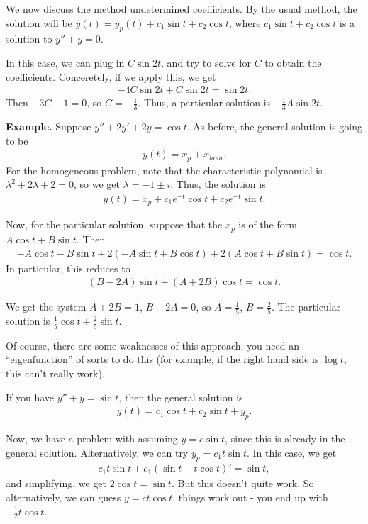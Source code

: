 \documentclass{article}
\begin{document}
We now discuss the method undetermined coefficients.  By the usual method, the solution will be $y(t) = y_p(t) + c_1 \sin t + c_2 \cos t$, where $c_1 \sin t + c_2 \cos t$ is a solution to $y'' + y = 0$.

In this case, we can plug in $C \sin 2t$, and try to solve for $C$ to obtain the coefficients.  Conceretely, if we apply this, we get
\begin{align*}
  - 4 C \sin 2t + C \sin 2t = \sin 2t.
\end{align*}
Then $-3C - 1 = 0$, so $C = -\frac{1}{3}$.  Thus, a particular solution is $- \frac{1}{3} A \sin 2t$.


{\bf Example.} Suppose $y'' + 2y' + 2y = \cos t$.  As before, the general solution is going to be
\begin{align*}
  y(t) = x_p + x_{hom}.
\end{align*}
For the homogeneous problem, note that the characteristic polynomial is $\lambda^2 + 2 \lambda + 2 = 0$, so we get $\lambda = -1 \pm i$.   Thus, the solution is
\begin{align*}
  y(t) = x_p + c_1 e^{-t} \cos t + c_2 e^{-t} \sin t.
\end{align*}

Now, for the particular solution, suppose that the $x_p$ is of the form $A \cos t + B \sin t$.  Then
\begin{align*} 
  - A \cos t - B \sin t + 2 \left( - A \sin t + B \cos t \right) + 2 \left( A \cos t + B \sin t \right) = \cos t.
\end{align*}
In particular, this reduces to
\begin{align*}
  (B - 2 A) \sin t + (A + 2 B) \cos t = \cos t.
\end{align*}

We get the system $A + 2B = 1$, $B - 2A = 0$, so  $A = \frac{1}{5}$, $B = \frac{2}{5}$.  The particular solution is $\frac{1}{5} \cos t + \frac{2}{5} \sin t$.

Of course, there are some weaknesses of this approach; you need an ``eigenfunction'' of sorts to do this (for example, if the right hand side is $\log t$, this can't really work).

If you have $y'' + y = \sin t$, then the general solution is
\begin{align*}
  y(t) = c_1 \cos t + c_2 \sin t + y_p.
\end{align*}

Now, we have a problem with assuming $y = c \sin t$, since this is already in the general solution.  Alternatively, we can try $y_p = c_1 t \sin t$.  In this case, we get
\begin{align*}
  c_1 t \sin t + c_1 \left( \sin t - t \cos t \right)' = \sin t,
\end{align*}
and simplifying, we get $2 \cos t = \sin t$.  But this doesn't quite work.  So alternatively, we can guess $y = c t \cos t$, things work out - you end up with $ - \frac{1}{2} t \cos t$.
\end{document}

